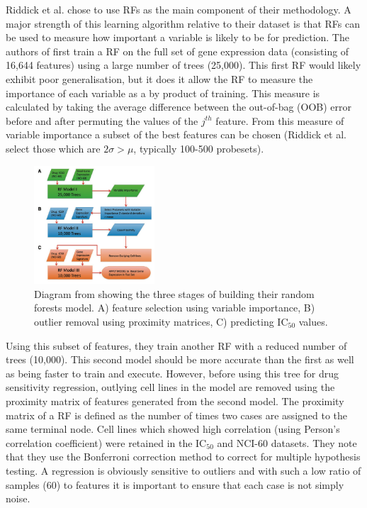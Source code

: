 \documentclass[journal]{IEEEtran}
\begin{document}
Riddick et al. chose to use RFs as the main component of their methodology. A major strength of this learning algorithm relative to their dataset is that RFs can be used to measure how important a variable is likely to be for prediction. The authors of \cite{riddick2011predicting} first train a RF on the full set of gene expression data (consisting of 16,644 features) using a large number of trees (25,000). This first RF would likely exhibit poor generalisation, but it does it allow the RF to measure the importance of each variable as a by product of training. This measure is calculated by taking the average difference between the out-of-bag (OOB) error before and after permuting the values of the $j^{th}$ feature. From this measure of variable importance a subset of the best features can be chosen (Riddick et al. select those which are $2 \sigma > \mu$, typically 100-500 probesets).


\begin{figure}[H]
\centering
\includegraphics[width=0.4\textwidth]{img/riddick.png}
\caption{Diagram from \cite{riddick2011predicting} showing the three stages of building their random forests model. A) feature selection using variable importance, B) outlier removal using proximity matrices, C) predicting IC$_{50}$ values.}
\label{fig:riddick-diagram}
\end{figure}

Using this subset of features, they train another RF with a reduced number of trees (10,000). This second model should be more accurate than the first as well as being faster to train and execute. However, before using this tree for drug sensitivity regression, outlying cell lines in the model are removed using the proximity matrix of features generated from the second model. The proximity matrix of a RF is defined as the number of times two cases are assigned to the same terminal node. Cell lines which showed high correlation (using Person's correlation coefficient) were retained in the IC$_{50}$ and NCI-60 datasets. They note that they use the Bonferroni correction method \cite{abdi2007bonferonni} to correct for multiple hypothesis testing. A regression is obviously sensitive to outliers and with such a low ratio of samples (60) to features it is important to ensure that each case is not simply noise.
\end{document}
